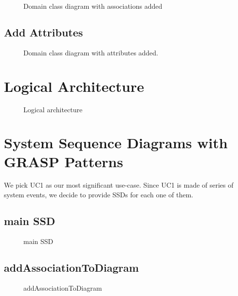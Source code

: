 \documentclass[12pt]{article}
\begin{document}
    \begin{figure}[H]
        \centering
        
        \caption{Domain class diagram with associations added}
        \label{fig:dmWithAss}
    \end{figure}

    \subsection{Add Attributes}

    \begin{figure}[H]
        \centering
        
        \caption{Domain class diagram with attributes added.}
        \label{fig:dmWithAssAndAtt}
    \end{figure}





    \section{Logical Architecture}

    \begin{figure}[H]
        \centering
        
        \caption{Logical architecture}
    \end{figure}


    \section{System Sequence Diagrams with GRASP Patterns}
    We pick UC1 as our most significant use-case. Since UC1 is made of series of system events, we decide to provide SSDs for each one of them.

    \subsection{main SSD}
    \begin{figure}[H]
        \centering
        
        \caption{main SSD}
    \end{figure}

    \subsection{addAssociationToDiagram}
    \begin{figure}[H]
        \centering
        
        \caption{addAssociationToDiagram}
    \end{figure}
\end{document}
